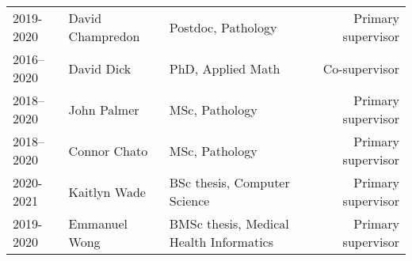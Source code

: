 \begin{tabular}{llp{2.5in}r}
2019-2020 & David Champredon & Postdoc, Pathology & Primary supervisor\\

2016--2020 & David Dick & PhD, Applied Math & Co-supervisor\\

2018--2020 & John Palmer & MSc, Pathology & Primary supervisor\\

2018--2020 & Connor Chato & MSc, Pathology & Primary supervisor\\

2020-2021 & Kaitlyn Wade & BSc thesis, Computer Science & Primary supervisor\\
2019-2020 & Emmanuel Wong & BMSc thesis, Medical Health Informatics & Primary supervisor\\

\hline

\end{tabular}



